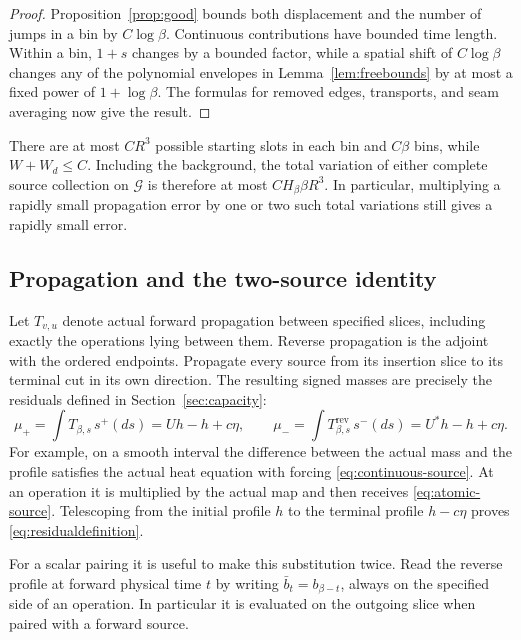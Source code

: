 \begin{proof}
Proposition~\ref{prop:good} bounds both displacement and the number
of jumps in a bin by $C\log\beta$.  Continuous contributions have
bounded time length.  Within a bin, $1+s$ changes by a bounded
factor, while a spatial shift of $C\log\beta$ changes any of the
polynomial envelopes in Lemma~\ref{lem:freebounds} by at most a
fixed power of $1+\log\beta$.  The formulas for removed edges,
transports, and seam averaging now give the result.
\end{proof}

There are at most $CR^3$ possible starting slots in each bin and
$C\beta$ bins, while $W+W_d\le C$.  Including the background,
the total variation of either complete source collection on
$\mathcal G$ is therefore at most $CH_\beta\beta R^3$.
In particular, multiplying a rapidly small propagation error by
one or two such total variations still gives a rapidly small error.

\subsection{Propagation and the two-source identity}

Let $T_{v,u}$ denote actual forward propagation between specified
slices, including exactly the operations lying between them.
Reverse propagation is the adjoint with the ordered endpoints.
Propagate every source from its insertion slice to its terminal cut
in its own direction.  The resulting signed masses are precisely
the residuals defined in Section~\ref{sec:capacity}:
\begin{equation}\label{eq:residualdefinition}
 \mu_+=\int T_{\beta,s}\,s^+(ds)=Uh-h+c\eta,
 \qquad
 \mu_- =\int T^{\mathrm{rev}}_{\beta,s}\,s^-(ds)
                         =U^*h-h+c\eta.
\end{equation}
For example, on a smooth interval the difference between the actual
mass and the profile satisfies the actual heat equation with forcing
\eqref{eq:continuous-source}.  At an operation it is multiplied by
the actual map and then receives \eqref{eq:atomic-source}.
Telescoping from the initial profile $h$ to the terminal profile
$h-c\eta$ proves \eqref{eq:residualdefinition}.

For a scalar pairing it is useful to make this substitution twice.
Read the reverse profile at forward physical time $t$ by writing
$\bar b_t=b_{\beta-t}$, always on the specified side of an operation.
In particular it is evaluated on the outgoing slice when paired
with a forward source.

